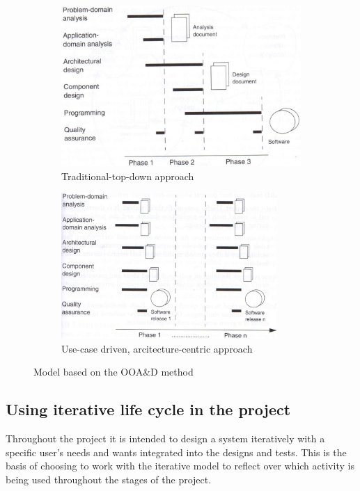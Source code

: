 \begin{figure}[H]
	\centering
	\begin{subfigure}[b]{0.48\textwidth}
		\includegraphics[width=\textwidth]{billeder/SUModel1.jpg}
		\caption{Traditional-top-down approach \citep[p.~16]{Rod-Aalborg}}
		\label{fig:SUModel1}
	\end{subfigure}
	\quad
	\begin{subfigure}[b]{0.48\textwidth}
		\includegraphics[width=0.9\textwidth]{billeder/SUModel2.jpg}
		\caption{Use-case driven, arcitecture-centric approach \citep[p.~17]{Rod-Aalborg}}
		\label{fig:SUModel2}
	\end{subfigure}
	\caption{Model based on the OOA\&D method}\label{fig:SUModels}
\end{figure}


\subsection{Using iterative life cycle in the project}
Throughout the project it is intended to design a system iteratively with a specific user’s needs and wants integrated into the designs and tests. This is the basis of choosing to work with the iterative model to reflect over which activity is being used throughout the stages of the project.